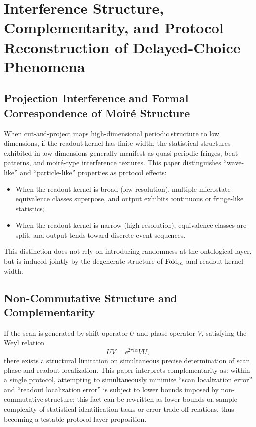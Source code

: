 \section{Interference Structure, Complementarity, and Protocol Reconstruction of Delayed-Choice Phenomena}

\subsection{Projection Interference and Formal Correspondence of Moiré Structure}

When cut-and-project maps high-dimensional periodic structure to low dimensions, if the readout kernel has finite width, the statistical structures exhibited in low dimensions generally manifest as quasi-periodic fringes, beat patterns, and moiré-type interference textures. This paper distinguishes ``wave-like'' and ``particle-like'' properties as protocol effects:
\begin{itemize}
  \item When the readout kernel is broad (low resolution), multiple microstate equivalence classes superpose, and output exhibits continuous or fringe-like statistics;
  \item When the readout kernel is narrow (high resolution), equivalence classes are split, and output tends toward discrete event sequences.
\end{itemize}
This distinction does not rely on introducing randomness at the ontological layer, but is induced jointly by the degenerate structure of $\mathrm{Fold}_m$ and readout kernel width.

\subsection{Non-Commutative Structure and Complementarity}

If the scan is generated by shift operator $U$ and phase operator $V$, satisfying the Weyl relation
\[
UV=e^{2\pi i\alpha}VU,
\]
there exists a structural limitation on simultaneous precise determination of scan phase and readout localization. This paper interprets complementarity as: within a single protocol, attempting to simultaneously minimize ``scan localization error'' and ``readout localization error'' is subject to lower bounds imposed by non-commutative structure; this fact can be rewritten as lower bounds on sample complexity of statistical identification tasks or error trade-off relations, thus becoming a testable protocol-layer proposition.

